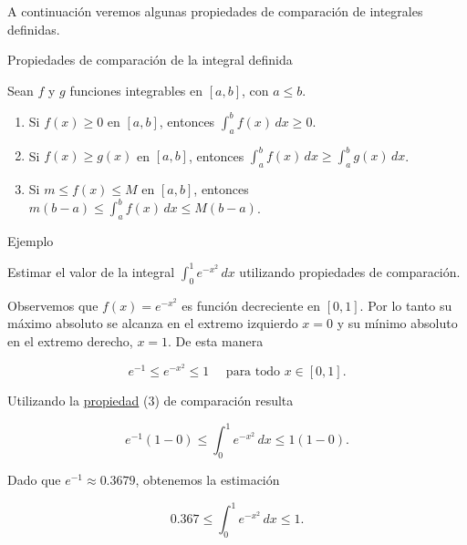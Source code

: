 \documentclass[
  letterpaper,
]{book}
\theoremstyle{plain}
\theoremstyle{remark}
\begin{document}
A continuación veremos algunas propiedades de comparación de integrales
definidas.

\label{teo-comparacion-integraldef}
Propiedades de comparación de la integral definida

Sean \(f\) y \(g\) funciones integrables en \([a,b]\), con \(a\leq b\).

\begin{enumerate}
\def\labelenumi{\arabic{enumi}.}
\item
  Si \(f(x)\geq 0\) en \([a,b]\), entonces
  \(\displaystyle\int_a^b f(x)\,dx\geq 0\).
\item
  Si \(f(x)\geq g(x)\) en \([a,b]\), entonces
  \(\displaystyle \int_a^b f(x)\,dx \geq \int_a^b g(x)\,dx\).
\item
  Si \(m\leq f(x)\leq M\) en \([a,b]\), entonces
  \(\displaystyle m(b-a)\leq \int_a^b f(x)\,dx \leq M(b-a)\).
\end{enumerate}

Ejemplo

Estimar el valor de la integral \(\displaystyle \int_0^1 e^{-x^2}\,dx\)
utilizando propiedades de comparación.

\begin{tcolorbox}[enhanced jigsaw, opacityback=0, left=2mm, opacitybacktitle=0.6, toprule=.15mm, bottomrule=.15mm, colbacktitle=quarto-callout-tip-color!10!white, titlerule=0mm, bottomtitle=1mm, title=\textcolor{quarto-callout-tip-color}{\faLightbulb}\hspace{0.5em}{Solución}, toptitle=1mm, colframe=quarto-callout-tip-color-frame, colback=white, breakable, rightrule=.15mm, arc=.35mm, leftrule=.75mm, coltitle=black]

Observemos que \(f(x)=e^{-x^2}\) es función decreciente en \([0,1]\).
Por lo tanto su máximo absoluto se alcanza en el extremo izquierdo
\(x=0\) y su mínimo absoluto en el extremo derecho, \(x=1\). De esta
manera

\[
e^{-1}\leq e^{-x^2}\leq 1 \quad \text{ para todo } x\in [0,1].
\]

Utilizando la \hyperref[teo-comparacion-integraldef]{propiedad} (3) de
comparación resulta

\[
e^{-1}(1-0)\leq \int_0^1 e^{-x^2}\,dx\leq 1(1-0).
\]

Dado que \(e^{-1}\approx 0.3679\), obtenemos la estimación

\[
0.367\leq \int_0^1 e^{-x^2}\,dx\leq 1.
\]

\end{tcolorbox}
\end{document}
